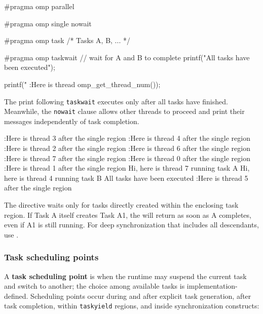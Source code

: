 \begin{codeblock}[language = C, morekeywords={pragma}]
#pragma omp parallel
{
    #pragma omp single nowait
    {
        #pragma omp task
        { /* Tasks A, B, ... */ }

        #pragma omp taskwait  // wait for A and B to complete
        printf("All tasks have been executed\n");
    }
    printf(" :Here is thread %
        omp_get_thread_num());
}
\end{codeblock}

The print following \texttt{taskwait} executes only after all tasks have finished. Meanwhile, the \texttt{nowait} clause allows other threads to proceed and print their messages independently of task completion.

\begin{codeblock}[language = {}, numbers=none, basicstyle=\ttfamily\scriptsize]
 :Here is thread 3 after the single region
 :Here is thread 4 after the single region
 :Here is thread 2 after the single region
 :Here is thread 6 after the single region
 :Here is thread 7 after the single region
 :Here is thread 0 after the single region
 :Here is thread 1 after the single region
	Hi, here is thread 7 running task A
	Hi, here is thread 4 running task B
 All tasks have been executed
 :Here is thread 5 after the single region
\end{codeblock}

\begin{warningblock}
The  directive waits only for tasks directly created within the enclosing task region. If Task A itself creates Task A1, the  will return as soon as A completes, even if A1 is still running. For deep synchronization that includes all descendants, use .
\end{warningblock}

\subsubsection{Task scheduling points}

A \textbf{task scheduling point} is when the runtime may suspend the current task and switch to another; the choice among available tasks is implementation-defined. Scheduling points occur during and after explicit task generation, after task completion, within \texttt{taskyield} regions, and inside synchronization constructs:

